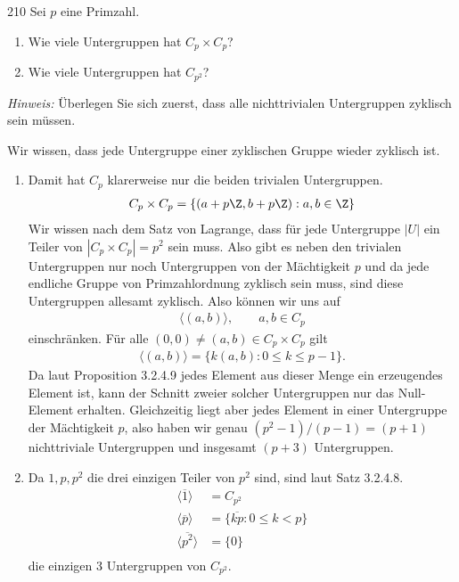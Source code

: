\begin{algebraUE}{210}
Sei $p$ eine Primzahl.
\begin{enumerate}
  \item Wie viele Untergruppen hat $C_p \times C_p$?
  \item Wie viele Untergruppen hat $C_{p^2}$?
\end{enumerate}
\textit{Hinweis:} Überlegen Sie sich zuerst, dass alle nichttrivialen Untergruppen
zyklisch sein müssen.
\end{algebraUE}
\begin{solution}
Wir wissen, dass jede Untergruppe einer zyklischen Gruppe wieder zyklisch ist.
\begin{enumerate}
  \item Damit hat $C_p$ klarerweise nur die beiden trivialen Untergruppen.
  \begin{align*}
    C_p \times C_p = \{(a + p\Z, b + p\Z): a,b \in \Z\}
  \end{align*}
  Wir wissen nach dem Satz von Lagrange, dass für jede Untergruppe
  $|U|$ ein Teiler von $|C_p \times C_p| = p^2$ sein muss. Also gibt es neben den
  trivialen Untergruppen nur noch Untergruppen von der Mächtigkeit $p$ und da
  jede endliche Gruppe von Primzahlordnung zyklisch sein muss, sind diese
  Untergruppen allesamt zyklisch.
  Also können wir uns auf
  \begin{align*}
    \langle (a,b) \rangle, \qquad a,b \in C_p
  \end{align*}
  einschränken. Für alle $(0,0) \neq (a,b) \in C_p \times C_p$ gilt
  \begin{align*}
    \langle (a,b) \rangle = \{k(a,b): 0 \leq k \leq p-1\}.
  \end{align*}
  Da laut Proposition 3.2.4.9 jedes Element aus dieser Menge ein erzeugendes Element
  ist, kann der Schnitt zweier solcher Untergruppen nur das Null-Element erhalten.
  Gleichzeitig liegt aber jedes Element in einer Untergruppe der Mächtigkeit $p$,
  also haben wir genau $(p^2-1)/(p-1) = (p+1)$ nichttriviale Untergruppen
  und insgesamt $(p+3)$ Untergruppen.
  \item Da $1,p,p^2$ die drei einzigen Teiler von $p^2$ sind, sind laut
  Satz 3.2.4.8.
  \begin{align*}
    \langle\overline{1}\rangle &= C_{p^2} \\
    \langle\overline{p}\rangle &= \{\overline{kp}: 0 \leq k < p\} \\
    \langle\overline{p^2}\rangle &= \{0\} \\
  \end{align*}
  die einzigen 3 Untergruppen von $C_{p^2}$.
\end{enumerate}
\end{solution}
